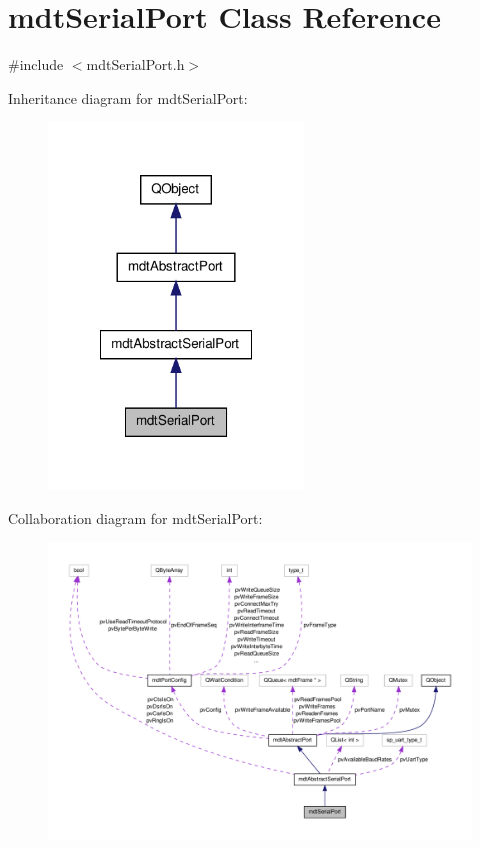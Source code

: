 \hypertarget{classmdt_serial_port}{\section{mdt\-Serial\-Port Class Reference}
\label{classmdt_serial_port}
}


{\ttfamily \#include $<$mdt\-Serial\-Port.\-h$>$}



Inheritance diagram for mdt\-Serial\-Port\-:
\nopagebreak
\begin{figure}[H]
\begin{center}
\leavevmode
\includegraphics[width=192pt]{classmdt_serial_port__inherit__graph}
\end{center}
\end{figure}


Collaboration diagram for mdt\-Serial\-Port\-:
\nopagebreak
\begin{figure}[H]
\begin{center}
\leavevmode
\includegraphics[width=350pt]{classmdt_serial_port__coll__graph}
\end{center}
\end{figure}
